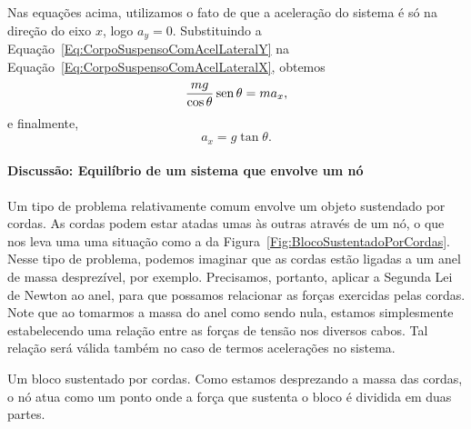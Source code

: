 \noindent{}Nas equações acima, utilizamos o fato de que a aceleração do sistema é só na direção do eixo $x$, logo $a_y = 0$.
Substituindo a Equação~\eqref{Eq:CorpoSuspensoComAcelLateralY} na Equação~\ref{Eq:CorpoSuspensoComAcelLateralX}, obtemos
\begin{equation}
    \frac{mg}{\cos\theta} \operatorname{sen}\theta = ma_x,
\end{equation}
%
e finalmente,
\begin{equation}
    a_x = g \tan\theta.
\end{equation}

\paragraph{Discussão: Equilíbrio de um sistema que envolve um nó}

Um tipo de problema relativamente comum envolve um objeto sustendado por cordas. As cordas podem estar atadas umas às outras através de um nó, o que nos leva uma uma situação como a da Figura~\ref{Fig:BlocoSustentadoPorCordas}. Nesse tipo de problema, podemos imaginar que as cordas estão ligadas a um anel de massa desprezível, por exemplo. Precisamos, portanto, aplicar a Segunda Lei de Newton ao anel, para que possamos relacionar as forças exercidas pelas cordas. Note que ao tomarmos a massa do anel como sendo nula, estamos simplesmente estabelecendo uma relação entre as forças de tensão nos diversos cabos. Tal relação será válida também no caso de termos acelerações no sistema.

\begin{marginfigure}
\centering
{}
\caption{Um bloco sustentado por cordas. Como estamos desprezando a massa das cordas, o nó atua como um ponto onde a força que sustenta o bloco é dividida em duas partes.\label{Fig:BlocoSustentadoPorCordas}}
\end{marginfigure}

